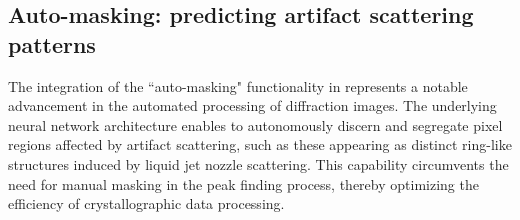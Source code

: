 \documentclass[a4paper]{article}
\begin{document}
\begin{table}
\caption{Merging statistics (TH: thaumatin; PK: proteinase).  TH results were
merged from run 31, 32, 33, 34 and 36, whereas PK results were merged from run
37 and 38.}
\label{tb : merge}
\centering
{}
\end{table}


\subsection{Auto-masking: predicting artifact scattering patterns}

The integration of the ``auto-masking" functionality in \peaknet{} represents a
notable advancement in the automated processing of diffraction images.  The
underlying neural network architecture enables \peaknet{} to autonomously
discern and segregate pixel regions affected by artifact scattering, such as
these appearing as distinct ring-like structures induced by liquid jet nozzle
scattering.  This capability circumvents the need for manual masking in the peak
finding process, thereby optimizing the efficiency of crystallographic data
processing.
\end{document}
